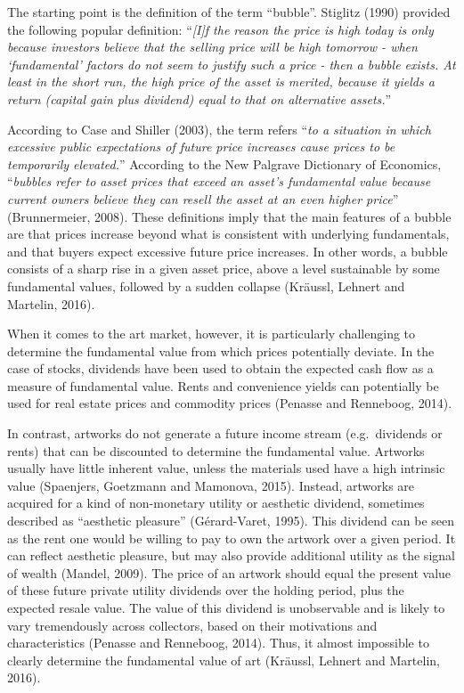 \documentclass[12pt,]{article}
\begin{document}
The starting point is the definition of the term ``bubble''. Stiglitz
(1990) provided the following popular definition: ``\emph{{[}I{]}f the
reason the price is high today is only because investors believe that
the selling price will be high tomorrow - when `fundamental' factors do
not seem to justify such a price - then a bubble exists. At least in the
short run, the high price of the asset is merited, because it yields a
return (capital gain plus dividend) equal to that on alternative
assets.}''

According to Case and Shiller (2003), the term refers ``\emph{to a
situation in which excessive public expectations of future price
increases cause prices to be temporarily elevated.}'' According to the
New Palgrave Dictionary of Economics, ``\emph{bubbles refer to asset
prices that exceed an asset's fundamental value because current owners
believe they can resell the asset at an even higher price}''
(Brunnermeier, 2008). These definitions imply that the main features of
a bubble are that prices increase beyond what is consistent with
underlying fundamentals, and that buyers expect excessive future price
increases. In other words, a bubble consists of a sharp rise in a given
asset price, above a level sustainable by some fundamental values,
followed by a sudden collapse (Kräussl, Lehnert and Martelin, 2016).

When it comes to the art market, however, it is particularly challenging
to determine the fundamental value from which prices potentially
deviate. In the case of stocks, dividends have been used to obtain the
expected cash flow as a measure of fundamental value. Rents and
convenience yields can potentially be used for real estate prices and
commodity prices (Penasse and Renneboog, 2014).

In contrast, artworks do not generate a future income stream
(e.g.~dividends or rents) that can be discounted to determine the
fundamental value. Artworks usually have little inherent value, unless
the materials used have a high intrinsic value (Spaenjers, Goetzmann and
Mamonova, 2015). Instead, artworks are acquired for a kind of
non-monetary utility or aesthetic dividend, sometimes described as
``aesthetic pleasure'' (Gérard-Varet, 1995). This dividend can be seen
as the rent one would be willing to pay to own the artwork over a given
period. It can reflect aesthetic pleasure, but may also provide
additional utility as the signal of wealth (Mandel, 2009). The price of
an artwork should equal the present value of these future private
utility dividends over the holding period, plus the expected resale
value. The value of this dividend is unobservable and is likely to vary
tremendously across collectors, based on their motivations and
characteristics (Penasse and Renneboog, 2014). Thus, it almost
impossible to clearly determine the fundamental value of art (Kräussl,
Lehnert and Martelin, 2016).
\end{document}
